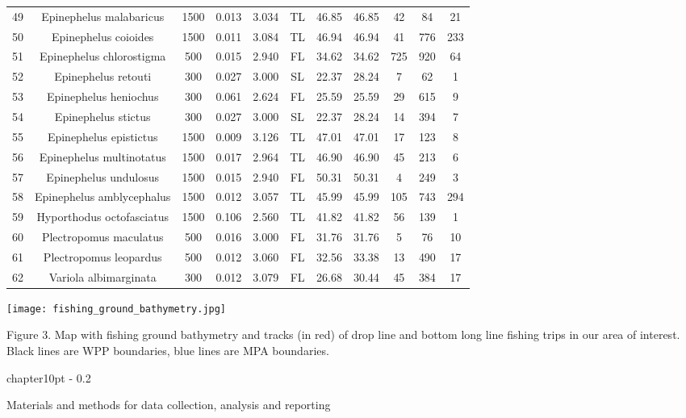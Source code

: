 \documentclass{report}\usepackage[]{graphicx}\usepackage[]{color}
\makeatletter
\renewcommand\chapter{\@startsection%
{chapter}{1}{0pt}%
{-\baselineskip}%
{0.2\baselineskip}%
{\raggedright\bf}}%
\makeatother
\begin{document}
\begin{table}[ht]
{\begin{tabular}{ccccccccccc}
  49 & Epinephelus malabaricus & 1500 & 0.013 & 3.034 & TL & 46.85 & 46.85 & 42 & 84 & 21 \\ 
  50 & Epinephelus coioides & 1500 & 0.011 & 3.084 & TL & 46.94 & 46.94 & 41 & 776 & 233 \\ 
  51 & Epinephelus chlorostigma & 500 & 0.015 & 2.940 & FL & 34.62 & 34.62 & 725 & 920 & 64 \\ 
  52 & Epinephelus retouti & 300 & 0.027 & 3.000 & SL & 22.37 & 28.24 & 7 & 62 & 1 \\ 
  53 & Epinephelus heniochus & 300 & 0.061 & 2.624 & FL & 25.59 & 25.59 & 29 & 615 & 9 \\ 
  54 & Epinephelus stictus & 300 & 0.027 & 3.000 & SL & 22.37 & 28.24 & 14 & 394 & 7 \\ 
  55 & Epinephelus epistictus & 1500 & 0.009 & 3.126 & TL & 47.01 & 47.01 & 17 & 123 & 8 \\ 
  56 & Epinephelus multinotatus & 1500 & 0.017 & 2.964 & TL & 46.90 & 46.90 & 45 & 213 & 6 \\ 
  57 & Epinephelus undulosus & 1500 & 0.015 & 2.940 & FL & 50.31 & 50.31 & 4 & 249 & 3 \\ 
  58 & Epinephelus amblycephalus & 1500 & 0.012 & 3.057 & TL & 45.99 & 45.99 & 105 & 743 & 294 \\ 
  59 & Hyporthodus octofasciatus & 1500 & 0.106 & 2.560 & TL & 41.82 & 41.82 & 56 & 139 & 1 \\ 
  60 & Plectropomus maculatus & 500 & 0.016 & 3.000 & FL & 31.76 & 31.76 & 5 & 76 & 10 \\ 
  61 & Plectropomus leopardus & 500 & 0.012 & 3.060 & FL & 32.56 & 33.38 & 13 & 490 & 17 \\ 
  62 & Variola albimarginata & 300 & 0.012 & 3.079 & FL & 26.68 & 30.44 & 45 & 384 & 17 \\ 
   \hline
\end{tabular}
}
\end{table}


\begin{center}
\graphicspath{{/root/R-project/IFishGrouper/Images/}}
\texttt{[image: fishing\_ground\_bathymetry.jpg]}

Figure 3. Map with fishing ground bathymetry and tracks (in red) of drop line and bottom long line fishing trips in our area of interest. Black lines are WPP boundaries, blue lines are MPA boundaries.
\end{center}

\clearpage
\newpage

\chapter{Materials and methods for data collection, analysis and reporting}

\end{document}
